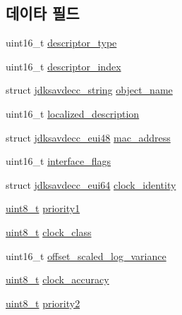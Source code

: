 \subsection*{데이타 필드}
\begin{DoxyCompactItemize}
\item 
uint16\+\_\+t \hyperlink{structjdksavdecc__descriptor__avb__interface_ab7c32b6c7131c13d4ea3b7ee2f09b78d}{descriptor\+\_\+type}
\item 
uint16\+\_\+t \hyperlink{structjdksavdecc__descriptor__avb__interface_a042bbc76d835b82d27c1932431ee38d4}{descriptor\+\_\+index}
\item 
struct \hyperlink{structjdksavdecc__string}{jdksavdecc\+\_\+string} \hyperlink{structjdksavdecc__descriptor__avb__interface_a7d1f5945a13863b1762fc6db74fa8f80}{object\+\_\+name}
\item 
uint16\+\_\+t \hyperlink{structjdksavdecc__descriptor__avb__interface_a0926f846ca65a83ad5bb06b4aff8f408}{localized\+\_\+description}
\item 
struct \hyperlink{structjdksavdecc__eui48}{jdksavdecc\+\_\+eui48} \hyperlink{structjdksavdecc__descriptor__avb__interface_a335a1976f38f9eb92655c394f62bea82}{mac\+\_\+address}
\item 
uint16\+\_\+t \hyperlink{structjdksavdecc__descriptor__avb__interface_adc7cb8c2df340891c22794bfac689e7d}{interface\+\_\+flags}
\item 
struct \hyperlink{structjdksavdecc__eui64}{jdksavdecc\+\_\+eui64} \hyperlink{structjdksavdecc__descriptor__avb__interface_a248176d42ca2055074ceb7d8df29700e}{clock\+\_\+identity}
\item 
\hyperlink{stdint_8h_aba7bc1797add20fe3efdf37ced1182c5}{uint8\+\_\+t} \hyperlink{structjdksavdecc__descriptor__avb__interface_af98f08e3d1b016cd549310197ba8673c}{priority1}
\item 
\hyperlink{stdint_8h_aba7bc1797add20fe3efdf37ced1182c5}{uint8\+\_\+t} \hyperlink{structjdksavdecc__descriptor__avb__interface_aafe98ca785cdce0ce5eaa26f2930d2fe}{clock\+\_\+class}
\item 
uint16\+\_\+t \hyperlink{structjdksavdecc__descriptor__avb__interface_aa6a39c2a4a7071642573bb3b4e0a0a54}{offset\+\_\+scaled\+\_\+log\+\_\+variance}
\item 
\hyperlink{stdint_8h_aba7bc1797add20fe3efdf37ced1182c5}{uint8\+\_\+t} \hyperlink{structjdksavdecc__descriptor__avb__interface_a708d6d971b6be997cf8d3e683951ceb0}{clock\+\_\+accuracy}
\item 
\hyperlink{stdint_8h_aba7bc1797add20fe3efdf37ced1182c5}{uint8\+\_\+t} \hyperlink{structjdksavdecc__descriptor__avb__interface_ac04b889463a96b43985cb82020e3c39b}{priority2}

\end{DoxyCompactItemize}
